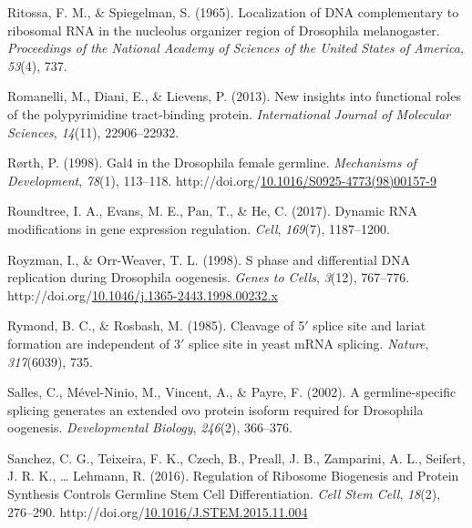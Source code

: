 \documentclass[12pt,oneside]{reedthesis}
\newlength{\cslhangindent}
\newenvironment{CSLReferences}[2] %
 {%
  \setlength{\parindent}{0pt}
  \ifodd #1 \everypar{\setlength{\hangindent}{\cslhangindent}}\ignorespaces\fi
  \ifnum #2 > 0
  \setlength{\parskip}{#2\baselineskip}
  \fi
 }%
 {}
\begin{document}
\begin{CSLReferences}{1}{0}
\leavevmode{}%
Ritossa, F. M., \& Spiegelman, S. (1965). Localization of {DNA} complementary to ribosomal {RNA} in the nucleolus organizer region of {Drosophila} melanogaster. \emph{Proceedings of the National Academy of Sciences of the United States of America}, \emph{53}(4), 737.

\leavevmode{}%
Romanelli, M., Diani, E., \& Lievens, P. (2013). New insights into functional roles of the polypyrimidine tract-binding protein. \emph{International Journal of Molecular Sciences}, \emph{14}(11), 22906--22932.

\leavevmode{}%
Rørth, P. (1998). Gal4 in the {Drosophila} female germline. \emph{Mechanisms of Development}, \emph{78}(1), 113--118. http://doi.org/\href{https://doi.org/10.1016/S0925-4773(98)00157-9}{10.1016/S0925-4773(98)00157-9}

\leavevmode{}%
Roundtree, I. A., Evans, M. E., Pan, T., \& He, C. (2017). Dynamic {RNA} modifications in gene expression regulation. \emph{Cell}, \emph{169}(7), 1187--1200.

\leavevmode{}%
Royzman, I., \& Orr-Weaver, T. L. (1998). S phase and differential {DNA} replication during {Drosophila} oogenesis. \emph{Genes to Cells}, \emph{3}(12), 767--776. http://doi.org/\href{https://doi.org/10.1046/j.1365-2443.1998.00232.x}{10.1046/j.1365-2443.1998.00232.x}

\leavevmode{}%
Rymond, B. C., \& Rosbash, M. (1985). Cleavage of 5{\({'}\)} splice site and lariat formation are independent of 3{\({'}\)} splice site in yeast {mRNA} splicing. \emph{Nature}, \emph{317}(6039), 735.

\leavevmode{}%
Salles, C., Mével-Ninio, M., Vincent, A., \& Payre, F. (2002). A germline-specific splicing generates an extended ovo protein isoform required for {Drosophila} oogenesis. \emph{Developmental Biology}, \emph{246}(2), 366--376.

\leavevmode{}%
Sanchez, C. G., Teixeira, F. K., Czech, B., Preall, J. B., Zamparini, A. L., Seifert, J. R. K., \ldots{} Lehmann, R. (2016). Regulation of {Ribosome Biogenesis} and {Protein Synthesis Controls Germline Stem Cell Differentiation}. \emph{Cell Stem Cell}, \emph{18}(2), 276--290. http://doi.org/\href{https://doi.org/10.1016/J.STEM.2015.11.004}{10.1016/J.STEM.2015.11.004}


\end{CSLReferences}
\end{document}
